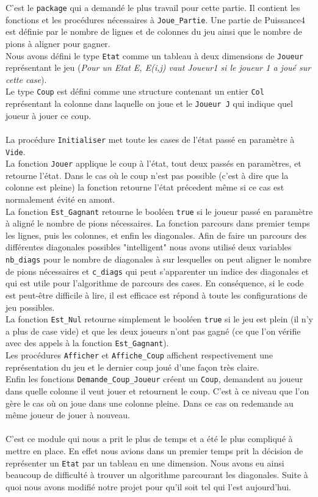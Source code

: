 \documentclass[a4paper,11pt]{article}
\begin{document}
C'est le {\tt package} qui a demandé le plus travail pour cette partie.
Il contient les fonctions et les procédures nécessaires à {\tt Joue\_Partie}.
Une partie de Puissance4 est définie par le nombre de lignes et de colonnes
du jeu ainsi que le nombre de pions à aligner pour gagner. \\
Nous avons défini le type {\tt Etat} comme un tableau à deux dimensions de
{\tt Joueur} représentant le jeu ({\it Pour un Etat E, E(i,j) vaut Joueur1 si
le joueur 1 a joué sur cette case}). \\
Le type {\tt Coup} est défini comme une structure contenant un entier {\tt Col}
représentant la colonne dans laquelle on joue et le {\tt Joueur J} qui indique
quel joueur à jouer ce coup.\\
\\
La procédure {\tt Initialiser} met toute les cases de l'état passé en paramètre
à {\tt Vide}. \\
La fonction {\tt Jouer} applique le coup à l'état, tout deux
passés en paramètres, et retourne l'état. Dans le cas où le coup n'est pas
possible (c'est à dire que la colonne est pleine) la fonction retourne l'état
précedent même si ce cas est normalement évité en amont. \\
La fonction {\tt Est\_Gagnant} retourne le booléen {\tt true} si le joueur passé
en paramètre à aligné le nombre de pions nécessaires. La fonction parcours dans
premier temps les lignes, puis les colonnes, et enfin les diagonales. Afin
de faire un parcours des différentes diagonales possibles "intelligent" nous avons
utilisé deux variables {\tt nb\_diags} pour le nombre de diagonales à sur
lesquelles on peut aligner le nombre de pions nécessaires et {\tt c\_diags}
qui peut s'apparenter un indice des diagonales et qui est utile pour
l'algorithme de parcours des cases. En conséquence, si le code est peut-être
difficile à lire, il est efficace est répond à toute les configurations de jeu
possibles.\\
La fonction {\tt Est\_Nul} retourne simplement le booléen {\tt true} si le jeu
est plein (il n'y a plus de case vide) et que les deux joueurs n'ont pas gagné
(ce que l'on vérifie avec des appels à la fonction {\tt Est\_Gagnant}). \\
Les procédures {\tt Afficher} et {\tt Affiche\_Coup} affichent respectivement
une représentation du jeu et le dernier coup joué d'une façon très claire. \\
Enfin les fonctions {\tt Demande\_Coup\_Joueur} créent un {\tt Coup}, demandent
au joueur dans quelle colonne il veut jouer et retournent le coup. C'est à ce niveau
que l'on gère le cas où on joue dans une colonne pleine. Dans ce cas on
redemande au même joueur de jouer à nouveau.\\
\\
C'est ce module qui nous a prit le plus de temps et a été le plus compliqué
à mettre en place. En effet nous avions dans un premier temps prit la décision
de représenter un {\tt Etat} par un tableau en une dimension. Nous avons eu
ainsi beaucoup de difficulté à trouver un algorithme parcourant les diagonales.
Suite à quoi nous avons modifié notre projet pour qu'il soit tel qui l'est
aujourd'hui.
\end{document}
